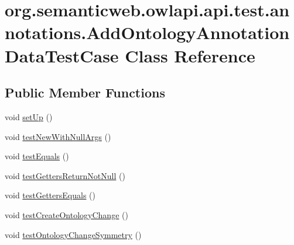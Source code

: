 \hypertarget{classorg_1_1semanticweb_1_1owlapi_1_1api_1_1test_1_1annotations_1_1_add_ontology_annotation_data_test_case}{\section{org.\-semanticweb.\-owlapi.\-api.\-test.\-annotations.\-Add\-Ontology\-Annotation\-Data\-Test\-Case Class Reference}
\label{classorg_1_1semanticweb_1_1owlapi_1_1api_1_1test_1_1annotations_1_1_add_ontology_annotation_data_test_case}
}
\subsection*{Public Member Functions}
\begin{DoxyCompactItemize}
\item 
void \hyperlink{classorg_1_1semanticweb_1_1owlapi_1_1api_1_1test_1_1annotations_1_1_add_ontology_annotation_data_test_case_a79d43654035c24ca24c145e46d9106ac}{set\-Up} ()
\item 
void \hyperlink{classorg_1_1semanticweb_1_1owlapi_1_1api_1_1test_1_1annotations_1_1_add_ontology_annotation_data_test_case_a9cd622647b178364d6d0d8cbe1943207}{test\-New\-With\-Null\-Args} ()
\item 
void \hyperlink{classorg_1_1semanticweb_1_1owlapi_1_1api_1_1test_1_1annotations_1_1_add_ontology_annotation_data_test_case_a1d251f06d020b3e4a5e668d84802768d}{test\-Equals} ()
\item 
void \hyperlink{classorg_1_1semanticweb_1_1owlapi_1_1api_1_1test_1_1annotations_1_1_add_ontology_annotation_data_test_case_aad740a74740723a3c110823371a14747}{test\-Getters\-Return\-Not\-Null} ()
\item 
void \hyperlink{classorg_1_1semanticweb_1_1owlapi_1_1api_1_1test_1_1annotations_1_1_add_ontology_annotation_data_test_case_a49ec505eb694d5440bfc6eed6d62ac7c}{test\-Getters\-Equals} ()
\item 
void \hyperlink{classorg_1_1semanticweb_1_1owlapi_1_1api_1_1test_1_1annotations_1_1_add_ontology_annotation_data_test_case_a26ab1d58bfd560e7733243c8bf7c8cac}{test\-Create\-Ontology\-Change} ()
\item 
void \hyperlink{classorg_1_1semanticweb_1_1owlapi_1_1api_1_1test_1_1annotations_1_1_add_ontology_annotation_data_test_case_a1d1ffc3900367603f1e7490c2476d429}{test\-Ontology\-Change\-Symmetry} ()
\end{DoxyCompactItemize}
